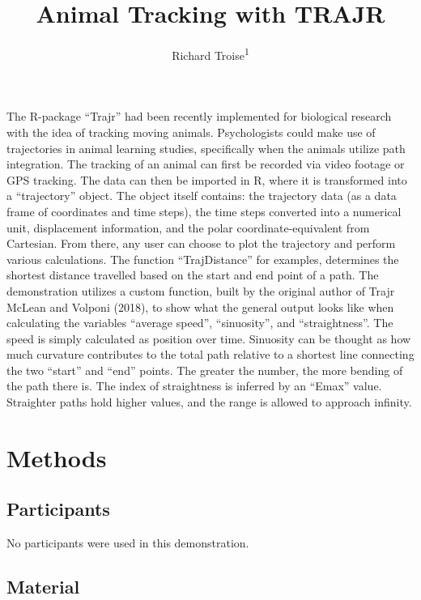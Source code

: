 \documentclass[man]{apa6}
\title{Animal Tracking with TRAJR}
\author{Richard Troise\textsuperscript{1}}
\date{}
\affiliation{
\vspace{0.5cm}
\textsuperscript{1} Brooklyn College}
\begin{document}
\maketitle

The R-package \enquote{Trajr} had been recently implemented for
biological research with the idea of tracking moving animals.
Psychologists could make use of trajectories in animal learning studies,
specifically when the animals utilize path integration. The tracking of
an animal can first be recorded via video footage or GPS tracking. The
data can then be imported in R, where it is transformed into a
\enquote{trajectory} object. The object itself contains: the trajectory
data (as a data frame of coordinates and time steps), the time steps
converted into a numerical unit, displacement information, and the polar
coordinate-equivalent from Cartesian. From there, any user can choose to
plot the trajectory and perform various calculations. The function
\enquote{TrajDistance} for examples, determines the shortest distance
travelled based on the start and end point of a path. The demonstration
utilizes a custom function, built by the original author of Trajr McLean
and Volponi (2018), to show what the general output looks like when
calculating the variables \enquote{average speed}, \enquote{sinuosity},
and \enquote{straightness}. The speed is simply calculated as position
over time. Sinuosity can be thought as how much curvature contributes to
the total path relative to a shortest line connecting the two
\enquote{start} and \enquote{end} points. The greater the number, the
more bending of the path there is. The index of straightness is inferred
by an \enquote{Emax} value. Straighter paths hold higher values, and the
range is allowed to approach infinity.

\section{Methods}\label{methods}

\subsection{Participants}\label{participants}

No participants were used in this demonstration.

\subsection{Material}\label{material}
\end{document}

